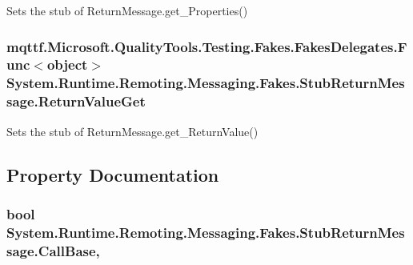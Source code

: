 Sets the stub of Return\-Message.\-get\-\_\-\-Properties()

\hypertarget{class_system_1_1_runtime_1_1_remoting_1_1_messaging_1_1_fakes_1_1_stub_return_message_af5c6ee89cdca6dadf4becf2a0f2c725b}{
\subsubsection[{Return\-Value\-Get}]{\setlength{\rightskip}{0pt plus 5cm}mqttf.\-Microsoft.\-Quality\-Tools.\-Testing.\-Fakes.\-Fakes\-Delegates.\-Func$<$object$>$ System.\-Runtime.\-Remoting.\-Messaging.\-Fakes.\-Stub\-Return\-Message.\-Return\-Value\-Get}}\label{class_system_1_1_runtime_1_1_remoting_1_1_messaging_1_1_fakes_1_1_stub_return_message_af5c6ee89cdca6dadf4becf2a0f2c725b}


Sets the stub of Return\-Message.\-get\-\_\-\-Return\-Value()



\subsection{Property Documentation}
\hypertarget{class_system_1_1_runtime_1_1_remoting_1_1_messaging_1_1_fakes_1_1_stub_return_message_a83d57d87feef8022cc3708023e270930}{
\subsubsection[{Call\-Base}]{\setlength{\rightskip}{0pt plus 5cm}bool System.\-Runtime.\-Remoting.\-Messaging.\-Fakes.\-Stub\-Return\-Message.\-Call\-Base\hspace{0.3cm}{\ttfamily [get]}, {\ttfamily [set]}}}\label{class_system_1_1_runtime_1_1_remoting_1_1_messaging_1_1_fakes_1_1_stub_return_message_a83d57d87feef8022cc3708023e270930}


